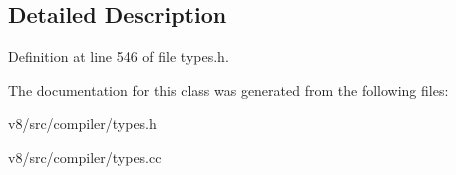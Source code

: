 \subsection{Detailed Description}


Definition at line 546 of file types.\+h.



The documentation for this class was generated from the following files\+:\begin{DoxyCompactItemize}
\item 
v8/src/compiler/types.\+h\item 
v8/src/compiler/types.\+cc\end{DoxyCompactItemize}
